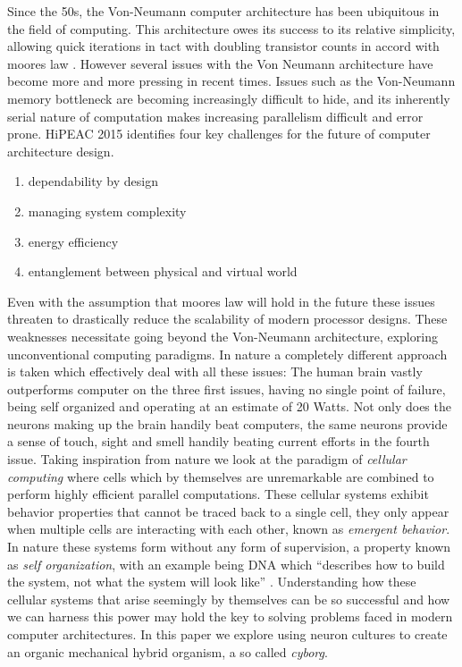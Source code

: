 Since the 50s, the Von-Neumann computer architecture has been ubiquitous in the
field of computing. This architecture owes its success to its relative
simplicity, allowing quick iterations in tact with doubling transistor counts in
accord with moores law \cite{moore}.
However several issues with the Von Neumann architecture have become more and more
pressing in recent times.
Issues such as the Von-Neumann memory bottleneck are becoming increasingly
difficult to hide, and its inherently serial nature of computation makes
increasing parallelism difficult and error prone.
HiPEAC 2015\cite{HIPEAC} identifies four key challenges for the future of
computer architecture design.
\begin{enumerate}
\item dependability by design
\item managing system complexity
\item energy efficiency
\item entanglement between physical and virtual world
\end{enumerate}
Even with the assumption that moores law will hold in the future these issues
threaten to drastically reduce the scalability of modern processor designs.
These weaknesses necessitate going beyond the Von-Neumann architecture,
exploring unconventional computing paradigms.
In nature a completely different approach is taken which effectively deal with
all these issues:
The human brain vastly outperforms computer on the three first issues, having no
single point of failure, being self organized and operating at an estimate of 20 Watts.
Not only does the neurons making up the brain handily beat computers, the same
neurons provide a sense of touch, sight and smell handily beating current
efforts in the fourth issue.
Taking inspiration from nature we look at the paradigm of \textit{cellular computing}
\cite{sipper_emergence_1999} where cells which by themselves are unremarkable
are combined to perform highly efficient parallel computations.
These cellular systems exhibit behavior properties that cannot be
traced back to a single cell, they only appear when multiple cells are
interacting with each other, known as \textit{emergent behavior}.
In nature these systems form without any form of supervision, a property known
as \textit{self organization}, with an example being 
DNA which ``describes how to build the system, not what the system will look
like'' \cite{tufte_evo_2009}.
Understanding how these cellular systems that arise seemingly by
themselves can be so successful and how we can harness this power may hold the
key to solving problems faced in modern computer architectures.
In this paper we explore using neuron cultures to create an organic mechanical
hybrid organism, a so called \textit{cyborg}.
